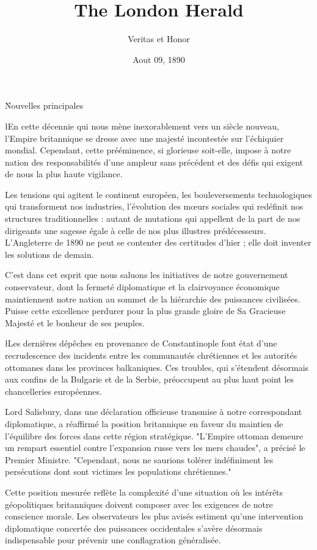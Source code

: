 \documentclass{news}
\title    {The London Herald}
\subtitle {Veritas et Honor}
\date     {Aout 09, 1890}
\begin{document}
\h{Nouvelles principales}

\l{E}n cette décennie qui nous mène inexorablement vers un siècle nouveau, l'Empire britannique se dresse avec une majesté incontestée sur l'échiquier mondial. Cependant, cette prééminence, si glorieuse soit-elle, impose à notre nation des responsabilités d'une ampleur sans précédent et des défis qui exigent de nous la plus haute vigilance.

Les tensions qui agitent le continent européen, les bouleversements technologiques qui transforment nos industries, l'évolution des mœurs sociales qui redéfinit nos structures traditionnelles : autant de mutations qui appellent de la part de nos dirigeants une sagesse égale à celle de nos plus illustres prédécesseurs. L'Angleterre de 1890 ne peut se contenter des certitudes d'hier ; elle doit inventer les solutions de demain.

C'est dans cet esprit que nous saluons les initiatives de notre gouvernement conservateur, dont la fermeté diplomatique et la clairvoyance économique maintiennent notre nation au sommet de la hiérarchie des puissances civilisées. Puisse cette excellence perdurer pour la plus grande gloire de Sa Gracieuse Majesté et le bonheur de ses peuples.

\l{L}es dernières dépêches en provenance de Constantinople font état d'une recrudescence des incidents entre les communautés chrétiennes et les autorités ottomanes dans les provinces balkaniques. Ces troubles, qui s'étendent désormais aux confins de la Bulgarie et de la Serbie, préoccupent au plus haut point les chancelleries européennes.

Lord Salisbury, dans une déclaration officieuse transmise à notre correspondant diplomatique, a réaffirmé la position britannique en faveur du maintien de l'équilibre des forces dans cette région stratégique. "L'Empire ottoman demeure un rempart essentiel contre l'expansion russe vers les mers chaudes", a précisé le Premier Ministre. "Cependant, nous ne saurions tolérer indéfiniment les persécutions dont sont victimes les populations chrétiennes."

Cette position mesurée reflète la complexité d'une situation où les intérêts géopolitiques britanniques doivent composer avec les exigences de notre conscience morale. Les observateurs les plus avisés estiment qu'une intervention diplomatique concertée des puissances occidentales s'avère désormais indispensable pour prévenir une conflagration généralisée.
\end{document}
